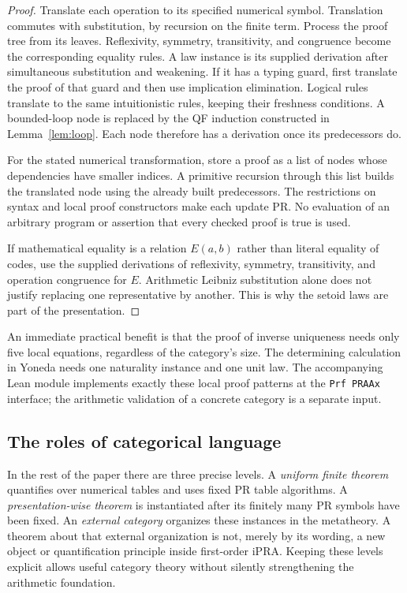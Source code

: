 \begin{proof}
Translate each operation to its specified numerical symbol. Translation
commutes with substitution, by recursion on the finite term. Process the
proof tree from its leaves. Reflexivity, symmetry, transitivity, and congruence
become the corresponding equality rules. A law instance is its supplied
derivation after simultaneous substitution and weakening. If it has a typing
guard, first translate the proof of that guard and then use implication
elimination. Logical rules translate to the same intuitionistic rules, keeping
their freshness conditions. A bounded-loop node is replaced by the QF induction
constructed in Lemma~\ref{lem:loop}. Each node therefore has a derivation once
its predecessors do.

For the stated numerical transformation, store a proof as a list of nodes
whose dependencies have smaller indices. A primitive recursion through this
list builds the translated node using the already built predecessors.
The restrictions on syntax and local proof constructors make each update PR.
No evaluation of an arbitrary program or assertion that every checked proof is
true is used.

If mathematical equality is a relation $E(a,b)$ rather than literal equality
of codes, use the supplied derivations of reflexivity, symmetry, transitivity,
and operation congruence for $E$. Arithmetic Leibniz substitution alone does
not justify replacing one representative by another. This is why the setoid
laws are part of the presentation.
\end{proof}

An immediate practical benefit is that the proof of inverse uniqueness needs
only five local equations, regardless of the category's size. The determining
calculation in Yoneda needs one naturality instance and one unit law. The
accompanying Lean module implements exactly these local proof patterns at the
\texttt{Prf PRAAx} interface; the arithmetic validation of a concrete category
is a separate input.

\subsection{The roles of categorical language}

In the rest of the paper there are three precise levels. A \emph{uniform finite
theorem} quantifies over numerical tables and uses fixed PR table algorithms.
A \emph{presentation-wise theorem} is instantiated after its finitely many PR
symbols have been fixed. An \emph{external category} organizes these instances
in the metatheory. A theorem about that external organization is not, merely
by its wording, a new object or quantification principle inside first-order
iPRA. Keeping these levels explicit allows useful category theory without
silently strengthening the arithmetic foundation.
